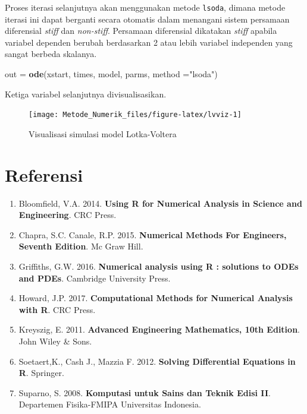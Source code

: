 \documentclass[
]{book}
\newenvironment{Shaded}{\begin{snugshade}}{\end{snugshade}}
\newcommand{\AttributeTok}[1]{\textcolor[rgb]{0.13,0.29,0.53}{#1}}
\newcommand{\FunctionTok}[1]{\textcolor[rgb]{0.13,0.29,0.53}{\textbf{#1}}}
\newcommand{\NormalTok}[1]{#1}
\newcommand{\OtherTok}[1]{\textcolor[rgb]{0.56,0.35,0.01}{#1}}
\newcommand{\StringTok}[1]{\textcolor[rgb]{0.31,0.60,0.02}{#1}}
\providecommand{\tightlist}{%
  \setlength{\itemsep}{0pt}\setlength{\parskip}{0pt}}
\theoremstyle{definition}
\theoremstyle{definition}
\theoremstyle{definition}
\theoremstyle{definition}
\theoremstyle{remark}
\begin{document}
Proses iterasi selanjutnya akan menggunakan metode \texttt{lsoda}, dimana metode iterasi ini dapat berganti secara otomatis dalam menangani sistem persamaan diferensial \emph{stiff} dan \emph{non-stiff}. Persamaan diferensial dikatakan \emph{stiff} apabila variabel dependen berubah berdasarkan 2 atau lebih variabel independen yang sangat berbeda skalanya.

\begin{Shaded}
\begin{Highlighting}[]
\NormalTok{out }\OtherTok{=} \FunctionTok{ode}\NormalTok{(xstart, times, model, parms, }
          \AttributeTok{method =}\StringTok{"lsoda"}\NormalTok{)}
\end{Highlighting}
\end{Shaded}

Ketiga variabel selanjutnya divisualisasikan.

\begin{figure}

{\centering \texttt{[image: Metode\_Numerik\_files/figure-latex/lvviz-1]} 

}

\caption{Visualisasi simulasi model Lotka-Voltera}\label{fig:lvviz}
\end{figure}

\hypertarget{referensi-9}{%
\section{Referensi}\label{referensi-9}}

\begin{enumerate}
\def\labelenumi{\arabic{enumi}.}
\tightlist
\item
  Bloomfield, V.A. 2014. \textbf{Using R for Numerical Analysis in Science and Engineering}. CRC Press.
\item
  Chapra, S.C. Canale, R.P. 2015. \textbf{Numerical Methods For Engineers, Seventh Edition}. Mc Graw Hill.
\item
  Griffiths, G.W. 2016. \textbf{Numerical analysis using R : solutions to ODEs and PDEs}. Cambridge University Press.
\item
  Howard, J.P. 2017. \textbf{Computational Methods for Numerical Analysis with R}. CRC Press.
\item
  Kreyszig, E. 2011. \textbf{Advanced Engineering Mathematics, 10th Edition}. John Wiley \& Sons.
\item
  Soetaert,K., Cash J., Mazzia F. 2012. \textbf{Solving Differential Equations in R}. Springer.
\item
  Suparno, S. 2008. \textbf{Komputasi untuk Sains dan Teknik Edisi II}. Departemen Fisika-FMIPA Universitas Indonesia.
\end{enumerate}
\end{document}
